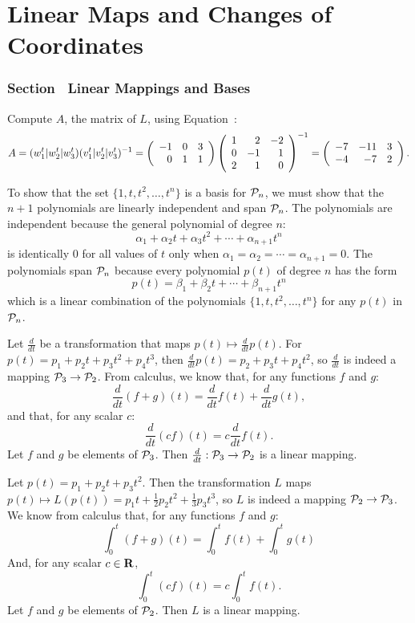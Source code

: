 \chapter{Linear Maps and Changes of Coordinates}

\subsection*{Section~\protect{\ref{Sect:linmap}} Linear Mappings and Bases}

Compute $A$, the matrix of $L$, using Equation~:
\[ A = (w_1^t|w_2^t|w_3^t)(v_1^t|v_2^t|v_3^t)^{-1} =
\left(\begin{array}{rrr} -1 & 0 & 3 \\ 0 & 1 & 1 \end{array}\right)
\left(\begin{array}{rrr} 1 & 2 & -2 \\ 0 & -1 & 1 \\ 2 & 1 & 0\end{array}\right)^{-1} =
\left(\begin{array}{rrr} -7 & -11 & 3 \\ -4 & -7 & 2
\end{array}\right). \]

To show that the set $\{1,t,t^2,\dots,t^n\}$ is a basis for
${\cal P}_n$, we must show that the $n + 1$ polynomials are
linearly independent and span ${\cal P}_n$.  The polynomials are
independent because the general polynomial of degree $n$:
\[
\alpha_1 + \alpha_2t + \alpha_3t^2 + \cdots + \alpha_{n+1}t^n
\]
is identically $0$ for all values of $t$ only when $\alpha_1 =
\alpha_2 = \cdots = \alpha_{n + 1} = 0$.  The polynomials span
${\cal P}_n$ because every polynomial $p(t)$ of degree $n$ has
the form
\[ p(t) = \beta_1 + \beta_2t + \cdots + \beta_{n + 1}t^n \]
which is a linear combination of the polynomials
$\{1,t,t^2,\dots,t^n\}$ for any $p(t)$ in ${\cal P}_n$.

Let $\frac{d}{dt}$ be a transformation that maps $p(t) \mapsto
\frac{d}{dt}p(t)$.  For $p(t) =  p_1 + p_2t + p_3t^2 + p_4t^3$, then
$\frac{d}{dt}p(t) = p_2 + p_3t + p_4t^2$, so $\frac{d}{dt}$ is indeed
a mapping ${\cal P}_3 \rightarrow {\cal P}_2$.  From calculus, we
know that, for any functions $f$ and $g$:
\[ \frac{d}{dt}(f + g)(t) = \frac{d}{dt}f(t) + \frac{d}{dt}g(t), \]
and that, for any scalar $c$:
\[ \frac{d}{dt}(cf)(t) = c\frac{d}{dt}f(t). \]
Let $f$ and $g$ be elements of ${\cal P}_3$.  Then
$\frac{d}{dt}: {\cal P}_3 \rightarrow {\cal P}_2$ is a linear mapping.

Let $p(t) = p_1 + p_2t + p_3t^2$.  Then the transformation $L$
maps $p(t) \mapsto L(p(t)) = p_1t + \frac{1}{2}p_2t^2 +
\frac{1}{3}p_3t^3$, so $L$ is indeed a mapping ${\cal P}_2
\rightarrow {\cal P}_3$.  We know from calculus that, for any
functions $f$ and $g$:
\[ \int_0^t(f + g)(t) = \int_0^tf(t) + \int_0^tg(t) \]
And, for any scalar $c \in \mbox{$\bf{R}$}$,
\[ \int_0^t(cf)(t) = c\int_0^tf(t). \]
Let $f$ and $g$ be elements of ${\cal P}_2$.  Then $L$ is a linear
mapping.

